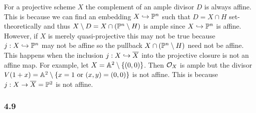 \documentclass[12pt]{article}
\begin{document}
\begin{enumerate}
\begin{rmk}
For a projective scheme $X$ the complement of an ample divisor $D$ is always affine. This is because we can find an embedding $X \embed \P^n$ such that $D = X \cap H$ set-theoretically and thus $X \setminus D = X \cap (\P^n \setminus H)$ is ample since $X \embed \P^n$ is affine. However, if $X$ is merely quasi-projective this may not be true because $j : X \embed \P^n$ may not be affine so the pullback $X \cap (\P^n \setminus H)$ need not be affine. This happens when the inclusion $j : X \embed \overline{X}$ into the projective closure is not an affine map. For example, let $X = \A^2 \setminus \{ (0,0) \}$. Then $\struct{X}$ is ample but the divisor $V(1 + x) = \A^2 \setminus \{ x = 1 \text{ or } (x,y) = (0,0) \}$ is not affine. This is because $j : X \to \overline{X} = \P^2$ is not affine. 
\end{rmk}
\end{enumerate}

\subsubsection{4.9}
\end{document}
